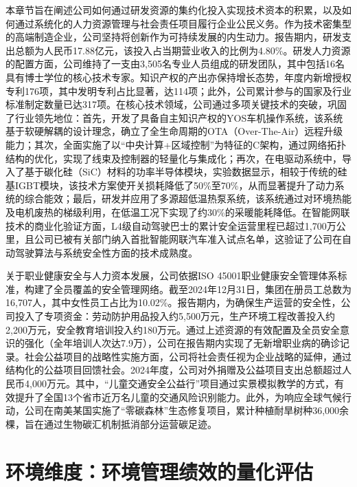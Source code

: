 \documentclass[a4paper,12pt]{article}
\begin{document}
本章节旨在阐述公司如何通过研发资源的集约化投入实现技术资本的积累，以及如何通过系统化的人力资源管理与社会责任项目履行企业公民义务。作为技术密集型的高端制造企业，公司坚持将创新作为可持续发展的内生动力。报告期内，研发支出总额为人民币17.88亿元，该投入占当期营业收入的比例为4.80\%。研发人力资源的配置方面，公司维持了一支由3,505名专业人员组成的研发团队，其中包括16名具有博士学位的核心技术专家。知识产权的产出亦保持增长态势，年度内新增授权专利176项，其中发明专利占比显著，达114项；此外，公司累计参与的国家及行业标准制定数量已达317项。在核心技术领域，公司通过多项关键技术的突破，巩固了行业领先地位：首先，开发了具备自主知识产权的YOS车机操作系统，该系统基于软硬解耦的设计理念，确立了全生命周期的OTA（Over-The-Air）远程升级能力；其次，全面实施了以“中央计算+区域控制”为特征的C架构，通过网络拓扑结构的优化，实现了线束及控制器的轻量化与集成化；再次，在电驱动系统中，导入了基于碳化硅（SiC）材料的功率半导体模块，实验数据显示，相较于传统的硅基IGBT模块，该技术方案使开关损耗降低了50\%至70\%，从而显著提升了动力系统的综合能效；最后，研发并应用了多源超低温热泵系统，该系统通过对环境热能及电机废热的梯级利用，在低温工况下实现了约30\%的采暖能耗降低。在智能网联技术的商业化验证方面，L4级自动驾驶巴士的累计安全运营里程已超过1,700万公里，且公司已被有关部门纳入首批智能网联汽车准入试点名单，这验证了公司在自动驾驶算法与系统安全性方面的技术成熟度。

关于职业健康安全与人力资本发展，公司依据ISO 45001职业健康安全管理体系标准，构建了全员覆盖的安全管理网络。截至2024年12月31日，集团在册员工总数为16,707人，其中女性员工占比为10.02\%。报告期内，为确保生产运营的安全性，公司投入了专项资金：劳动防护用品投入约5,500万元，生产环境工程改善投入约2,200万元，安全教育培训投入约180万元。通过上述资源的有效配置及全员安全意识的强化（全年培训人次达7.9万），公司在报告期内实现了无新增职业病的确诊记录。社会公益项目的战略性实施方面，公司将社会责任视为企业战略的延伸，通过结构化的公益项目回馈社会。2024年度，公司对外捐赠及公益项目支出总额超过人民币4,000万元。其中，“儿童交通安全公益行”项目通过实景模拟教学的方式，有效提升了全国13个省市近万名儿童的交通风险识别能力。此外，为响应全球气候行动，公司在南美某国实施了“零碳森林”生态修复项目，累计种植耐旱树种36,000余棵，旨在通过生物碳汇机制抵消部分运营碳足迹。

\section{环境维度：环境管理绩效的量化评估}
\end{document}
